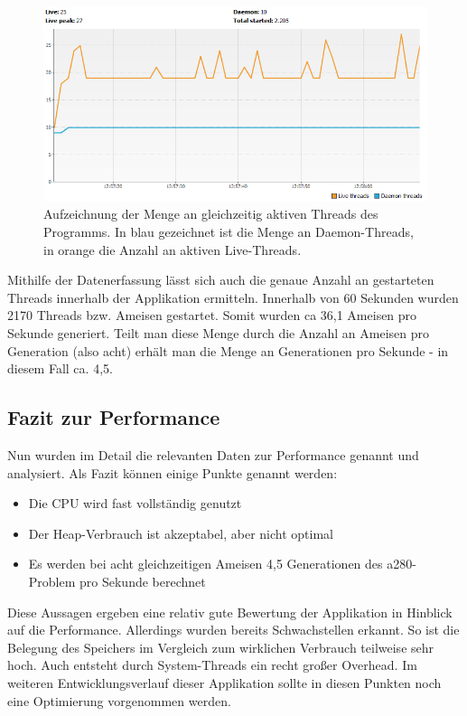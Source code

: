 \begin{figure}[h]
	\centering
	\includegraphics[width=0.9\linewidth]{images/threadUsage.png}
	\caption{Aufzeichnung der Menge an gleichzeitig aktiven Threads des Programms. In blau gezeichnet ist die Menge an Daemon-Threads, in orange die Anzahl an aktiven Live-Threads.}
	\label{threadUsage}
\end{figure}

Mithilfe der Datenerfassung lässt sich auch die genaue Anzahl an gestarteten Threads innerhalb der Applikation ermitteln. Innerhalb von 60 Sekunden wurden 2170 Threads bzw. Ameisen gestartet. Somit wurden ca 36,1 Ameisen pro Sekunde generiert. Teilt man diese Menge durch die Anzahl an Ameisen pro Generation (also acht) erhält man die Menge an Generationen pro Sekunde - in diesem Fall ca. 4,5.

\newpage
\subsection{Fazit zur Performance}
Nun wurden im Detail die relevanten Daten zur Performance genannt und analysiert. Als Fazit können einige Punkte genannt werden:
\begin{itemize}
	\item Die CPU wird fast vollständig genutzt
	\item Der Heap-Verbrauch ist akzeptabel, aber nicht optimal
	\item Es werden bei acht gleichzeitigen Ameisen 4,5 Generationen des a280-Problem pro Sekunde berechnet
\end{itemize}
Diese Aussagen ergeben eine relativ gute Bewertung der Applikation in Hinblick auf die Performance. Allerdings wurden bereits Schwachstellen erkannt. So ist die Belegung des Speichers im Vergleich zum wirklichen Verbrauch teilweise sehr hoch. Auch entsteht durch System-Threads ein recht großer Overhead. Im weiteren Entwicklungsverlauf dieser Applikation sollte in diesen Punkten noch eine Optimierung vorgenommen werden.